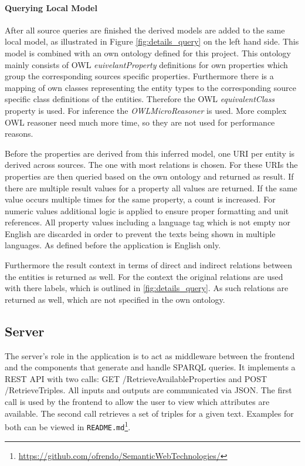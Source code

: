 \paragraph{Querying Local Model}
After all source queries are finished the derived models are added to the same local model, as illustrated in Figure \ref{fig:details_query} on the left hand side. This model is combined with an own ontology defined for this project. This  ontology mainly consists of OWL \textit{euivelantProperty} definitions for own properties which group the corresponding sources specific properties. Furthermore there is a mapping of own classes representing the entity types to the corresponding source specific class definitions of the entities. Therefore the OWL \textit{equivalentClass} property is used. For inference the \textit{OWLMicroReasoner} is used. More complex OWL reasoner need much more time, so they are not used for performance reasons. 

Before the properties are derived from this inferred model, one URI per entity is derived across sources. The one with most relations is chosen. 
For these URIs the properties are then queried based on the own ontology and returned as result. If there are multiple result values for a property all values are returned. If the same value occurs multiple times for the same property, a count is increased. For numeric values additional logic is applied to ensure proper formatting and unit references. All property values including a language tag which is not empty nor English are discarded in order to prevent the texts being shown in multiple languages. As defined before the application is English only. 

Furthermore the result context in terms of direct and indirect relations between the entities is returned as well. For the context the original relations are used with there labels, which is outlined in \ref{fig:details_query}. As such relations are returned as well, which are not specified in the own ontology. 

\subsection{Server} 
\label{sec:server}
The server's role in the application is to act as middleware between the frontend and the components that generate and handle SPARQL queries. It implements a REST API with two calls: GET /RetrieveAvailableProperties and POST /RetrieveTriples. All inputs and outputs are communicated via JSON. The first call is used by the frontend to allow the user to view which attributes are available. The second call retrieves a set of triples for a given text. Examples for both can be viewed in \texttt{README.md}\footnote{\url{https://github.com/ofrendo/SemanticWebTechnologies/}}. 

